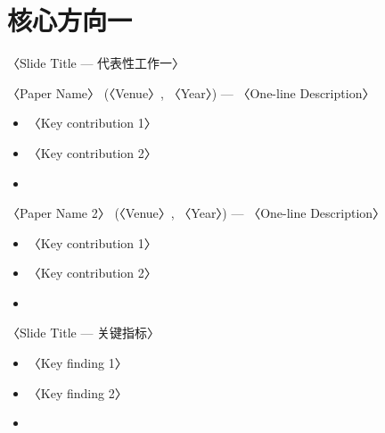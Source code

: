 \renewcommand{\secblurb}{〈本节一句话主旨：第一个核心方向的贡献与演变〉}
\section{核心方向一}

\begin{frame}{〈Slide Title — 代表性工作一〉}
  \begin{block}{〈Paper Name〉 (〈Venue〉, 〈Year〉) — 〈One-line Description〉}
    \begin{itemize}
      \item 〈Key contribution 1〉
      \item 〈Key contribution 2〉
      \item {}
    \end{itemize}
  \end{block}
  \tightgap
  \begin{block}{〈Paper Name 2〉 (〈Venue〉, 〈Year〉) — 〈One-line Description〉}
    \begin{itemize}
      \item 〈Key contribution 1〉
      \item 〈Key contribution 2〉
      \item {}
    \end{itemize}
  \end{block}
\end{frame}


\begin{frame}{〈Slide Title — 关键指标〉}
  \begin{itemize}
    \item 〈Key finding 1〉
    \item 〈Key finding 2〉
    \item {}
  \end{itemize}
  \tightgap
  \centering
  \hfill
  \hfill
\end{frame}

